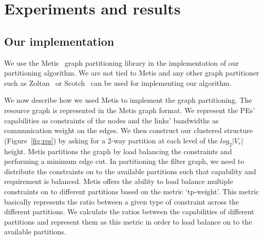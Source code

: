 \section{Experiments and results}
\label{sec:experiments-results}



\subsection{Our implementation}
\label{sec:our-implementation}

We use the Metis~\cite{gkar95} graph partitioning library in the implementation
of our partitioning algorithm. We are not tied to Metis and any other graph
partitioner such as Zoltan~\cite{kdev09} or Scotch~\cite{cche08} can be
used for implementing our algorithm. 

We now describe how we used Metis to implement the graph partitioning.
The resource graph is represented in the Metis graph format. We
represent the PEs' capabilities as constraints of the nodes and the
links' bandwidths as communication weight on the edges. We then
construct our clustered structure (Figure~\ref{fig:res}) by asking for a
2-way partition at each level of the $log_2|V_r|$ height. Metis
partitions the graph by load balancing the constraints and performing a
minimum edge cut.  In partitioning the filter graph, we need to distribute
the constraints on to the available partitions such that capability and requirement
is balanced. Metis offers the ability
to load balance multiple constraints on to different partitions based on
the metric \mbox{`tp-weight'}. This metric basically represents the ratio between
a given type of constraint across the different partitions. We calculate the ratios 
between the capabilities of different partitions and represent them as this metric
in order to load balance on to the available partitions.

